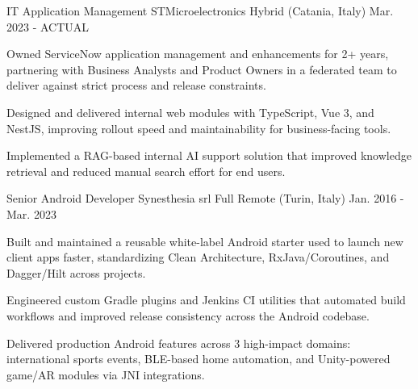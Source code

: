 


\begin{cventries}

\cventry
{IT Application Management} %
{STMicroelectronics} %
{Hybrid (Catania, Italy)} %
{Mar. 2023 - ACTUAL} %
{ %
	\begin{cvitems}
		\item {Owned ServiceNow application management and enhancements for 2+ years, partnering with Business Analysts and Product Owners in a federated team to deliver against strict process and release constraints.}
		\item {Designed and delivered internal web modules with TypeScript, Vue 3, and NestJS, improving rollout speed and maintainability for business-facing tools.}
		\item {Implemented a RAG-based internal AI support solution that improved knowledge retrieval and reduced manual search effort for end users.}
	\end{cvitems}
}


\vspace{5mm}

\cventry
{Senior Android Developer} %
{Synesthesia srl} %
{Full Remote (Turin, Italy)} %
{Jan. 2016 - Mar. 2023} %
{ %
	\begin{cvitems}
		\item {Built and maintained a reusable white-label Android starter used to launch new client apps faster, standardizing Clean Architecture, RxJava/Coroutines, and Dagger/Hilt across projects.}
		\item {Engineered custom Gradle plugins and Jenkins CI utilities that automated build workflows and improved release consistency across the Android codebase.}
		\item {Delivered production Android features across 3 high-impact domains: international sports events, BLE-based home automation, and Unity-powered game/AR modules via JNI integrations.}
	\end{cvitems}
}


\end{cventries}
